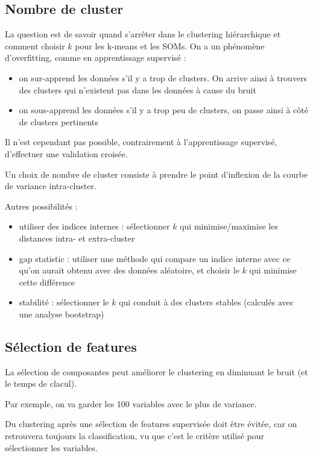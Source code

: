		
	\subsection{Nombre de cluster}
	
	La question est de savoir quand s'arrêter dans le clustering hiérarchique et comment choisir $k$ pour les k-means et les SOMs. On a un phénomène d'overfitting, comme en apprentissage supervisé :
	
	\begin{itemize}
		\item on sur-apprend les données s'il y a trop de clusters. On arrive ainsi à trouvers des clusters qui n'existent pas dans les données à cause du bruit
		\item on sous-apprend les données s'il y a trop peu de clusters, on passe ainsi à côté de clusters pertinents
	\end{itemize}
	
	Il n'est cependant pas possible, contrairement à l'apprentissage supervisé, d'effectuer une validation croisée.
	
	Un choix de nombre de cluster consiste à prendre le point d'inflexion de la courbe de variance intra-cluster.
	
	
	
	Autres possibilités :
	
	\begin{itemize}
		\item utiliser des indices internes : sélectionner $k$ qui minimise/maximise les distances intra- et extra-cluster
		\item gap statistic : utiliser une méthode qui compare un indice interne avec ce qu'on aurait obtenu avec des données aléatoire, et choisir le $k$ qui minimise cette différence
		\item stabilité : sélectionner le $k$ qui conduit à des clusters stables (calculés avec une analyse bootstrap)
	\end{itemize}
	
	\subsection{Sélection de features}
	
	La sélection de composantes peut améliorer le clustering en diminuant le bruit (et le temps de clacul).
	
	Par exemple, on va garder les 100 variables avec le plus de variance.
	
	Du clustering après une sélection de features supervisée doit être évitée, car on retrouvera toujours la classification, vu que c'est le critère utilisé pour sélectionner les variables.
	
